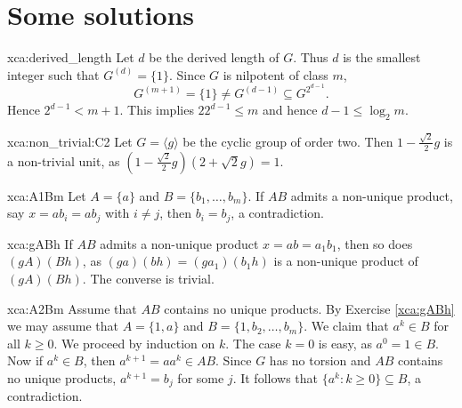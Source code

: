 \section*{Some solutions}

\pagestyle{plain}
\fancyhf{}
\fancyfoot[CE,CO]{\leftmark}
\fancyfoot[LE,RO]{\thepage}



\begin{sol}{xca:derived_length}
    Let $d$ be the derived length of $G$. Thus $d$ is the smallest integer
    such that $G^{(d)}=\{1\}$. Since $G$ is nilpotent of class $m$, 
    \[
    G^{(m+1)}=\{1\}\ne G^{(d-1)}\subseteq G^{2^{d-1}}.
    \]
    Hence $2^{d-1}<m+1$. This implies $22^{d-1}\leq m$ and hence
    $d-1\leq\log_2m$. 
\end{sol}

\begin{sol}{xca:non_trivial:C2}
    Let $G=\langle g\rangle$ be the cyclic group of order two. 
    Then $1-\frac{\sqrt{2}}{2}g$ is a non-trivial unit, as 
    $\left(1-\frac{\sqrt{2}}{2}g\right)\left(2+\sqrt{2}g\right)=1$.
\end{sol}

\begin{sol}{xca:A1Bm}
    Let $A=\{a\}$ and $B=\{b_1,\dots,b_m\}$. 
    If $AB$ admits a non-unique product, say $x=ab_i=ab_j$ with $i\ne j$, 
    then $b_i=b_j$, a contradiction.
\end{sol}

\begin{sol}{xca:gABh}
    If $AB$ admits a non-unique product $x=ab=a_1b_1$, then so does $(gA)(Bh)$, as
    $(ga)(bh)=(ga_1)(b_1h)$ is a non-unique product of $(gA)(Bh)$. 
    The converse is trivial. 
\end{sol}

\begin{sol}{xca:A2Bm}
    Assume that $AB$ contains no unique products. 
    By Exercise \ref{xca:gABh} we may assume that $A=\{1,a\}$ and $B=\{1,b_2,\dots,b_m\}$. 
    We claim that $a^k\in B$ for all $k\geq0$. We proceed by induction on $k$. The case
    $k=0$ is easy, as $a^0=1\in B$. Now if $a^k\in B$, then $a^{k+1}=aa^{k}\in AB$. Since $G$ has no torsion and 
    $AB$ contains no unique products, 
    $a^{k+1}=b_j$ for some $j$. It follows that $\{a^k:k\geq0\}\subseteq B$, a contradiction. 
\end{sol}

